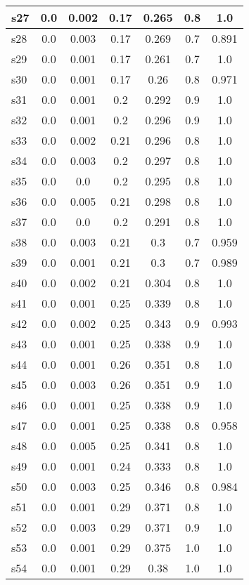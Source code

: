 \documentclass{article}
\begin{document}
\begin{tabular}{|l|c|c|c|c|c|c|}
\hline
s27 &0.0 & 0.002 & 0.17 & 0.265 & 0.8 & 1.0\\
\hline
s28 &0.0 & 0.003 & 0.17 & 0.269 & 0.7 & 0.891\\
\hline
s29 &0.0 & 0.001 & 0.17 & 0.261 & 0.7 & 1.0\\
\hline
s30 &0.0 & 0.001 & 0.17 & 0.26 & 0.8 & 0.971\\
\hline
s31 &0.0 & 0.001 & 0.2 & 0.292 & 0.9 & 1.0\\
\hline
s32 &0.0 & 0.001 & 0.2 & 0.296 & 0.9 & 1.0\\
\hline
s33 &0.0 & 0.002 & 0.21 & 0.296 & 0.8 & 1.0\\
\hline
s34 &0.0 & 0.003 & 0.2 & 0.297 & 0.8 & 1.0\\
\hline
s35 &0.0 & 0.0 & 0.2 & 0.295 & 0.8 & 1.0\\
\hline
s36 &0.0 & 0.005 & 0.21 & 0.298 & 0.8 & 1.0\\
\hline
s37 &0.0 & 0.0 & 0.2 & 0.291 & 0.8 & 1.0\\
\hline
s38 &0.0 & 0.003 & 0.21 & 0.3 & 0.7 & 0.959\\
\hline
s39 &0.0 & 0.001 & 0.21 & 0.3 & 0.7 & 0.989\\
\hline
s40 &0.0 & 0.002 & 0.21 & 0.304 & 0.8 & 1.0\\
\hline
s41 &0.0 & 0.001 & 0.25 & 0.339 & 0.8 & 1.0\\
\hline
s42 &0.0 & 0.002 & 0.25 & 0.343 & 0.9 & 0.993\\
\hline
s43 &0.0 & 0.001 & 0.25 & 0.338 & 0.9 & 1.0\\
\hline
s44 &0.0 & 0.001 & 0.26 & 0.351 & 0.8 & 1.0\\
\hline
s45 &0.0 & 0.003 & 0.26 & 0.351 & 0.9 & 1.0\\
\hline
s46 &0.0 & 0.001 & 0.25 & 0.338 & 0.9 & 1.0\\
\hline
s47 &0.0 & 0.001 & 0.25 & 0.338 & 0.8 & 0.958\\
\hline
s48 &0.0 & 0.005 & 0.25 & 0.341 & 0.8 & 1.0\\
\hline
s49 &0.0 & 0.001 & 0.24 & 0.333 & 0.8 & 1.0\\
\hline
s50 &0.0 & 0.003 & 0.25 & 0.346 & 0.8 & 0.984\\
\hline
s51 &0.0 & 0.001 & 0.29 & 0.371 & 0.8 & 1.0\\
\hline
s52 &0.0 & 0.003 & 0.29 & 0.371 & 0.9 & 1.0\\
\hline
s53 &0.0 & 0.001 & 0.29 & 0.375 & 1.0 & 1.0\\
\hline
s54 &0.0 & 0.001 & 0.29 & 0.38 & 1.0 & 1.0\\

\end{tabular}
\end{document}

